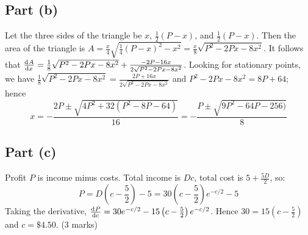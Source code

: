 \documentclass[a4paper]{report}
\begin{document}
\subsection*{Part (b)}
Let the three sides of the triangle be $ x $, $ \frac{1}{2}(P - x) $, and $ \frac{1}{2}(P - x) $. Then the area of the
triangle is $ A = \frac{x}{4}\sqrt{\frac{1}{4}(P - x)^2 - x^2} = \frac{x}{8} \sqrt{P^2 - 2Px - 8x^2} $. It follows
that $ \od{A}{x} = \frac{1}{8}\sqrt{P^2 - 2Px - 8x^2} + \frac{-2P - 16x}{2\sqrt{P^2 - 2Px - 8x^2}} $. Looking for stationary
points, we have $ \frac{1}{8}\sqrt{P^2 - 2Px - 8x^2} = \frac{2P + 16x}{2\sqrt{P^2 - 2Px - 8x^2}} $ and $ P^2 - 2Px - 8x^2 = 8P + 64 $; hence
\begin{displaymath}
  x = -\frac{2P \pm \sqrt{4P^2 + 32(P^2 - 8P - 64)}}{16} = -\frac{P \pm \sqrt{9P^2 -64P - 256)}}{8}
\end{displaymath}

\subsection*{Part (c)}
Profit $ P $ is income minus costs. Total income is $ Dc $, total cost is $ 5 + \frac{5D}{2} $, so:
\begin{displaymath}
  P = D\left(c - \frac{5}{2}\right) - 5 = 30\left(c - \frac{5}{2}\right)e^{-c/2} - 5
\end{displaymath}
Taking the derivative, $ \od{P}{c} = 30e^{-c/2} - 15\left(c - \frac{5}{2}\right)e^{-c/2} $.
Hence $ 30 = 15(c - \frac{5}{2}) $ and $ c = \$4.50 $. (3 marks)
\end{document}
